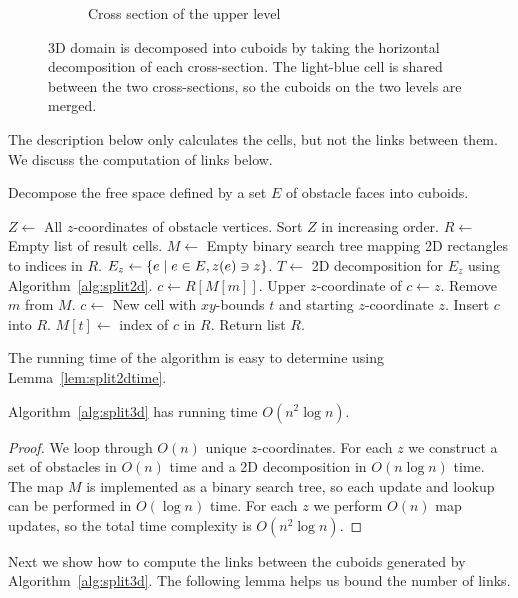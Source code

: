\documentclass[english,gradu]{tktltiki2018}
\begin{document}
\begin{figure}
\begin{subfigure}[t]{0.3\textwidth}
		\caption{Cross section of the upper level}
	\end{subfigure}
	\caption{3D domain is decomposed into cuboids by taking the horizontal decomposition of each cross-section. The light-blue cell is shared between the two cross-sections, so the cuboids on the two levels are merged.}\label{fig:split3d}
\end{figure}

The description below only calculates the cells, but not the links between them.
We discuss the computation of links below.

\begin{alg}\label{alg:split3d}
Decompose the free space defined by a set $E$ of obstacle faces into cuboids.
\begin{algorithmic}
\State $Z\gets$ All $z$-coordinates of obstacle vertices.
\State Sort $Z$ in increasing order.
\State $R\gets$ Empty list of result cells.
\State $M\gets$ Empty binary search tree mapping 2D rectangles to indices in $R$.
	\State $E_z\gets\left\{e \mid e\in E, z(e)\ni z\right\}$.
	\State $T\gets$ 2D decomposition for $E_z$ using Algorithm~\ref{alg:split2d}.
		\State $c\gets R[M[m]]$.
		\State Upper $z$-coordinate of $c\gets z$.
		\State Remove $m$ from $M$.
	\EndFor
		\State $c\gets$ New cell with $xy$-bounds $t$ and starting $z$-coordinate $z$.
		\State Insert $c$ into $R$.
		\State $M[t]\gets$ index of $c$ in $R$.
	\EndFor
\EndFor
\State Return list $R$.
\end{algorithmic}
\end{alg}

The running time of the algorithm is easy to determine using Lemma~\ref{lem:split2dtime}.

\begin{lem}\label{lem:split3dtime}Algorithm~\ref{alg:split3d} has running time $O(n^2\log n)$.\end{lem}
\begin{proof}
We loop through $O(n)$ unique $z$-coordinates.
For each $z$ we construct a set of obstacles in $O(n)$ time and a 2D decomposition in $O(n\log n)$ time.
The map $M$ is implemented as a binary search tree, so each update and lookup can be performed in $O(\log n)$ time.
For each $z$ we perform $O(n)$ map updates, so the total time complexity is $O(n^2\log n)$.
\end{proof}

Next we show how to compute the links between the cuboids generated by Algorithm~\ref{alg:split3d}.
The following lemma helps us bound the number of links.
\end{document}
